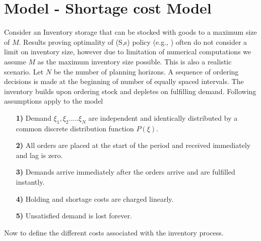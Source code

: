 \documentclass[11pt,a4paper,oneside]{report}
\begin{document}
\section{Model - Shortage cost Model}
Consider an Inventory storage that can be stocked with goods to a maximum size of $M$. Results proving optimality of (S,s) policy (e.g., \citep{scarf1959optimality}) often do not consider a limit on inventory size, however due to limitation of numerical computations we assume $M$ as the maximum inventory size possible.  This is also a realistic scenario. Let $N$ be the number of planning horizons. A sequence of ordering decisions is made at the beginning of number of equally spaced intervals. The inventory builds upon ordering stock and depletes on fulfilling demand. Following assumptions apply to the model 
\begin{enumerate}
\item[\textbf{1)}] Demand $\xi_1, \xi_2.....\xi_N$ are independent and identically distributed by a common discrete distribution function $P(\xi)$.
\item[\textbf{2)}] All orders are placed at the start of the period and received immediately and lag is zero.
\item[\textbf{3)}] Demands arrive immediately after the orders arrive and are fulfilled instantly.
\item[\textbf{4)}] Holding and shortage costs are charged linearly.
\item[\textbf{5)}] Unsatisfied demand is lost forever.
\end{enumerate}
\noindent Now to define the different costs associated with the inventory process.
\end{document}
